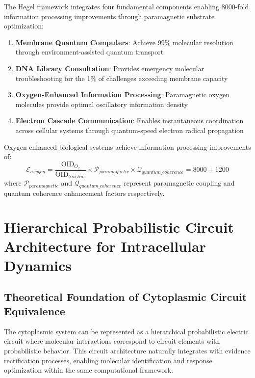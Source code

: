 ﻿\documentclass[11pt,a4paper]{article}
\begin{document}
The Hegel framework integrates four fundamental components enabling 8000-fold information processing improvements through paramagnetic substrate optimization:

\begin{enumerate}
\item \textbf{Membrane Quantum Computers}: Achieve 99\% molecular resolution through environment-assisted quantum transport
\item \textbf{DNA Library Consultation}: Provides emergency molecular troubleshooting for the 1\% of challenges exceeding membrane capacity
\item \textbf{Oxygen-Enhanced Information Processing}: Paramagnetic oxygen molecules provide optimal oscillatory information density
\item \textbf{Electron Cascade Communication}: Enables instantaneous coordination across cellular systems through quantum-speed electron radical propagation
\end{enumerate}

\begin{theorem}
Oxygen-enhanced biological systems achieve information processing improvements of:
\begin{equation}
\mathcal{E}_{oxygen} = \frac{\text{OID}_{O_2}}{\text{OID}_{baseline}} \times \mathcal{P}_{paramagnetic} \times \mathcal{Q}_{quantum\_coherence} = 8000 \pm 1200
\end{equation}
where $\mathcal{P}_{paramagnetic}$ and $\mathcal{Q}_{quantum\_coherence}$ represent paramagnetic coupling and quantum coherence enhancement factors respectively.
\end{theorem}

\section{Hierarchical Probabilistic Circuit Architecture for Intracellular Dynamics}

\subsection{Theoretical Foundation of Cytoplasmic Circuit Equivalence}

The cytoplasmic system can be represented as a hierarchical probabilistic electric circuit where molecular interactions correspond to circuit elements with probabilistic behavior. This circuit architecture naturally integrates with evidence rectification processes, enabling molecular identification and response optimization within the same computational framework.
\end{document}
